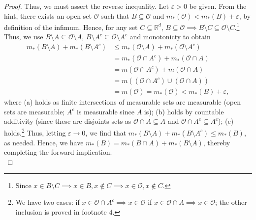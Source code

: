 \begin{proof}
	Thus, we must assert the reverse inequality. Let \( \varepsilon > 0 \) be given. From the hint, there exists an open set \( \mathcal{O}  \) such that \( B \subseteq \mathcal{O}  \) and \( m_*(\mathcal{O} ) < m_*(B) + \varepsilon   \), by definition of the infimum. Hence, for any set \( C \subseteq \mathbb{R}^{d}  \), \( B \subseteq \mathcal{O} \implies B \setminus C \subseteq \mathcal{O} \setminus C  \).\footnote{Since \( x \in B\setminus C \implies x \in B, x \notin C \implies x \in \mathcal{O}, x \notin C \).} Thus, we use \( B \setminus A \subseteq \mathcal{O} \setminus A \), \( B \setminus A^{c} \subseteq \mathcal{O} \setminus A^{c}    \) and monotonicty to obtain
\begin{align*}
	m_*(B \setminus A) + m_*(B \setminus A^{c} )   &\leq m_*(\mathcal{O} \setminus A) + m_*(\mathcal{O} \setminus A^{c} )    \\	
						       &= m_*(\mathcal{O} \cap A^{c} ) + m_*(\mathcal{O} \cap A) \\
						       &= m(\mathcal{O} \cap A^{c} ) + m(\mathcal{O} \cap A) \tag{a} \\
						       &= m((\mathcal{O} \cap A^{c} ) \cup (\mathcal{O} \cap A ))  \tag{b} \\
						       &= m(\mathcal{O} ) = m_*(\mathcal{O} )  < m_*(B) + \varepsilon \tag{c},  
\end{align*}
where (a) holds as finite intersections of measurable sets are measurable (open sets are measurable; \( A^{c}  \) is measurable since \( A \) is); (b) holds by countable additivity (since these are disjoints sets as \( \mathcal{O} \cap A \subseteq A\) and \( \mathcal{O} \cap A^{c} \subseteq A^{c} \)); (c) holds.\footnote{We have two cases: if \( x \in \mathcal{O} \cap A^{c} \implies x \in \mathcal{O}  \) if \( x \in \mathcal{O} \cap A \implies x \in \mathcal{O}  \); the other inclusion is proved in footnote 4.} Thus, letting \( \varepsilon \to 0 \), we find that \(m_*(B \setminus A) + m_*(B \setminus A^{c} ) \leq m_*(B) \), as needed. Hence, we have \(m_*(B) = m_*(B \cap A) + m_*(B \setminus A)\), thereby completing the forward implication. \\


\end{proof}
